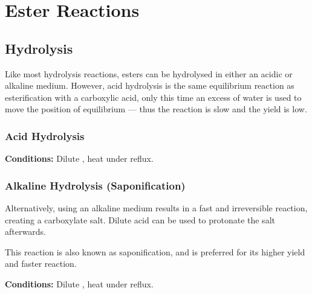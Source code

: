 	\pagebreak
	\section{Ester Reactions}

		\subsection{Hydrolysis}

			Like most hydrolysis reactions, esters can be hydrolysed in either an acidic or alkaline medium. However, acid hydrolysis is
			the same equilibrium reaction as esterification with a carboxylic acid, only this time an excess of water is used to move
			the position of equilibrium --- thus the reaction is slow and the yield is low.

			\subsubsection{Acid Hydrolysis}

				\vspace{1.5em}
				\vbox{\textbf{Conditions:}	\tabto{35mm}Dilute , heat under reflux.}




			\subsubsection{Alkaline Hydrolysis (Saponification)}

				Alternatively, using an alkaline medium results in a fast and irreversible reaction, creating a carboxylate salt. Dilute
				acid can be used to protonate the salt afterwards.

				This reaction is also known as saponification, and is preferred for its higher yield and faster reaction.

				\vspace{1.5em}
				\vbox{\textbf{Conditions:}	\tabto{35mm}Dilute , heat under reflux.}

